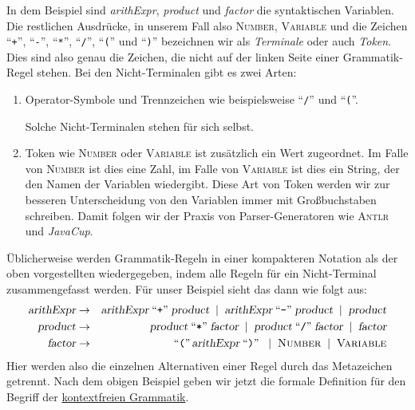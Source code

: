 In dem Beispiel sind \textsl{arithExpr}, \textsl{product} und \textsl{factor} die 
syntaktischen Variablen.  Die restlichen Ausdr\"ucke, in unserem Fall also \textsc{Number}, \textsc{Variable} und
die Zeichen 
``\texttt{+}'', ``\texttt{-}'', ``\texttt{*}'', ``\texttt{/}'', ``\texttt{(}'' und ``\texttt{)}''
bezeichnen wir als \emph{Terminale} oder auch \emph{Token}.  Dies sind also genau die
Zeichen, die nicht auf der linken Seite einer Grammatik-Regel stehen.
Bei den Nicht-Terminalen gibt es zwei Arten:
\begin{enumerate}
\item Operator-Symbole und Trennzeichen wie beispielsweise ``\texttt{/}'' und
      ``\texttt{(}''.  

      Solche Nicht-Terminalen stehen f\"ur sich selbst.
\item Token wie \textsc{Number} oder \textsc{Variable} ist zus\"atzlich ein Wert zugeordnet.
      Im Falle von \textsc{Number} ist dies eine Zahl, im Falle von \textsc{Variable}
      ist dies ein String, der den Namen der Variablen wiedergibt.  Diese Art von Token werden wir
      zur besseren Unterscheidung von den Variablen immer mit Gro{\ss}buchstaben schreiben.
      Damit folgen wir der Praxis von Parser-Generatoren wie \textsc{Antlr} und \textsl{JavaCup}.
\end{enumerate}
\"Ublicherweise werden Grammatik-Regeln in einer kompakteren Notation als der oben vorgestellten
wiedergegeben, indem alle Regeln f\"ur ein Nicht-Terminal zusammengefasst werden.  F\"ur unser Beispiel
sieht das dann wie folgt aus:
\begin{eqnarray*}
  \textsl{arithExpr} & \rightarrow & \textsl{arithExpr} \;\mbox{``\texttt{+}''}\; \textsl{product} \;\mid\;
                                     \textsl{arithExpr} \;\mbox{``\texttt{-}''}\; \textsl{product} \;\mid\; 
                                     \textsl{product}                                            \\
  \textsl{product}   & \rightarrow & \textsl{product} \;\mbox{``\texttt{*}''}\; \textsl{factor} \;\mid\;
                                     \textsl{product} \;\mbox{``\texttt{/}''}\; \textsl{factor} \;\mid\;
                                     \textsl{factor}                                             \\
  \textsl{factor}    & \rightarrow & \mbox{``\texttt{(}''}\, \textsl{arithExpr} \;\mbox{``\texttt{)}''}\; \;\mid\; 
                                     \textsc{Number} \;\mid\; \textsc{Variable}
\end{eqnarray*}
Hier werden also die einzelnen Alternativen einer Regel durch das Metazeichen \squoted{|}
getrennt.  Nach dem obigen Beispiel geben wir jetzt die formale Definition f\"ur den Begriff der
\href{http://en.wikipedia.org/wiki/Context-free_grammar}{kontextfreien Grammatik}.

